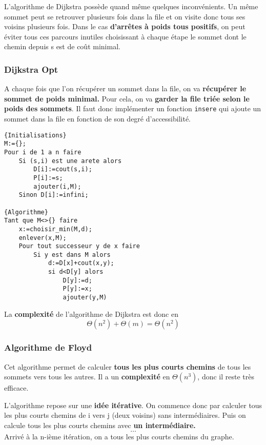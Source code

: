 L'algorithme de Dijkstra possède quand même quelques inconvénients. 
Un même sommet peut se retrouver plusieurs fois dans la file et on visite donc tous ses voisins plusieurs fois. 
Dans le cas \textbf{d'arrêtes à poids tous positifs}, on peut éviter tous ces parcours inutiles choisissant à chaque étape le sommet
dont le chemin depuis s est de coût minimal.

\subsubsection{Dijkstra Opt}

A chaque fois que l'on récupérer un sommet dans la file, on va \textbf{récupérer le sommet de poids minimal.} 
Pour cela, on va \textbf{garder la file triée selon le poids des sommets}. Il faut donc implémenter un fonction 
\texttt{insere} qui ajoute un sommet dans la file en fonction de son degré d'accessibilité. 

\begin{lstlisting}
{Initialisations}
M:={};
Pour i de 1 a n faire
    Si (s,i) est une arete alors
        D[i]:=cout(s,i);
        P[i]:=s;    
        ajouter(i,M);
    Sinon D[i]:=infini;

{Algorithme}
Tant que M<>{} faire
    x:=choisir_min(M,d);
    enlever(x,M);
    Pour tout successeur y de x faire
        Si y est dans M alors
            d:=D[x]+cout(x,y);
            si d<D[y] alors
                D[y]:=d;
                P[y]:=x;
                ajouter(y,M)
\end{lstlisting}

La \textbf{complexité} de l'algorithme de Dijkstra est donc en $$ \boxed{ \Theta(n^2) + \Theta(m) = \Theta(n^2) }$$

\subsubsection{Algorithme de Floyd}

Cet algorithme permet de calculer \textbf{tous les plus courts chemins} de tous les sommets vers tous les autres. 
Il a un \textbf{complexité} en $\Theta(n^3)$, donc il reste très efficace. 

L'algorithme repose sur une \textbf{idée itérative}. On commence donc par calculer tous les plus courts chemins de i vers j (deux voisins)
sans intermédiaires. 
Puis on calcule tous les plus courts chemins avec \textbf{un intermédiaire.}
$$ \dots$$ 
Arrivé à la n-ième itération, on a tous les plus courts chemins du graphe. 

